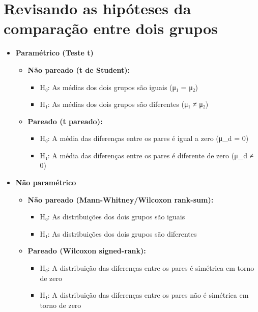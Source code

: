 \documentclass[
]{book}
\providecommand{\tightlist}{%
  \setlength{\itemsep}{0pt}\setlength{\parskip}{0pt}}
\begin{document}
\section{Revisando as hipóteses da comparação entre dois grupos}\label{revisando-as-hipuxf3teses-da-comparauxe7uxe3o-entre-dois-grupos}

\begin{itemize}
\tightlist
\item
  \textbf{Paramétrico (Teste t)}

  \begin{itemize}
  \tightlist
  \item
    \textbf{Não pareado (t de Student):}

    \begin{itemize}
    \tightlist
    \item
      H₀: As médias dos dois grupos são iguais (μ₁ = μ₂)
    \item
      H₁: As médias dos dois grupos são diferentes (μ₁ ≠ μ₂)
    \end{itemize}
  \item
    \textbf{Pareado (t pareado):}

    \begin{itemize}
    \tightlist
    \item
      H₀: A média das diferenças entre os pares é igual a zero (μ\_d = 0)
    \item
      H₁: A média das diferenças entre os pares é diferente de zero (μ\_d ≠ 0)
    \end{itemize}
  \end{itemize}
\item
  \textbf{Não paramétrico}

  \begin{itemize}
  \tightlist
  \item
    \textbf{Não pareado (Mann-Whitney/Wilcoxon rank-sum):}

    \begin{itemize}
    \tightlist
    \item
      H₀: As distribuições dos dois grupos são iguais
    \item
      H₁: As distribuições dos dois grupos são diferentes
    \end{itemize}
  \item
    \textbf{Pareado (Wilcoxon signed-rank):}

    \begin{itemize}
    \tightlist
    \item
      H₀: A distribuição das diferenças entre os pares é simétrica em torno de zero
    \item
      H₁: A distribuição das diferenças entre os pares não é simétrica em torno de zero
    \end{itemize}
  \end{itemize}
\end{itemize}
\end{document}
